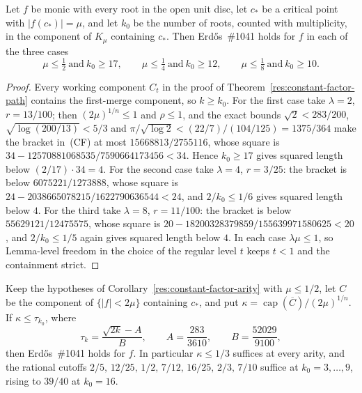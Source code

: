 \documentclass[11pt]{article}
\begin{document}
\begin{corollary}
\label{res:constant-factor-arity}
Let $f$ be monic with every root in the open unit disc, let $c_*$ be a
critical point with $|f(c_*)|=\mu$, and let $k_0$ be the number of roots,
counted with multiplicity, in the component of $K_\mu$ containing $c_*$.
Then Erd\H{o}s~\#1041 holds for $f$ in each of the three cases
\[
 \mu\le\tfrac12\ \text{and}\ k_0\ge17,\qquad
 \mu\le\tfrac14\ \text{and}\ k_0\ge12,\qquad
 \mu\le\tfrac18\ \text{and}\ k_0\ge10 .
\]
\end{corollary}

\begin{proof}
Every working component $C_t$ in the proof of
Theorem~\ref{res:constant-factor-path} contains the first-merge component, so
$k\ge k_0$.  For the first case take $\lambda=2$, $r=13/100$; then
$(2\mu)^{1/n}\le1$ and $\rho\le1$, and the exact bounds
$\sqrt2<283/200$, $\sqrt{\log(200/13)}<5/3$ and
$\pi/\sqrt{\log2}<(22/7)/(104/125)=1375/364$ make the bracket in~(CF) at most
$15668813/2755116$, whose square is $34-12570881068535/7590664173456<34$.
Hence $k_0\ge17$ gives squared length below $(2/17)\cdot34=4$.  For the second
case take $\lambda=4$, $r=3/25$: the bracket is below $6075221/1273888$, whose
square is $24-2038665078215/1622790636544<24$, and $2/k_0\le1/6$ gives squared
length below $4$.  For the third take $\lambda=8$, $r=11/100$: the bracket is
below $55629121/12475575$, whose square is
$20-18200328379859/155639971580625<20$, and $2/k_0\le1/5$ again gives squared
length below $4$.  In each case $\lambda\mu\le1$, so Lemma-level freedom in
the choice of the regular level $t$ keeps $t<1$ and the containment strict.
\end{proof}

\begin{corollary}
\label{res:constant-factor-capacity}
Keep the hypotheses of Corollary~\ref{res:constant-factor-arity} with
$\mu\le1/2$, let $C$ be the component of $\{|f|<2\mu\}$ containing $c_*$, and
put $\kappa=\operatorname{cap}(\overline C)/(2\mu)^{1/n}$.  If
$\kappa\le\tau_{k_0}$, where
\[
 \tau_k=\frac{\sqrt{2k}-A}{B},\qquad
 A=\frac{283}{3610},\qquad B=\frac{52029}{9100},
\]
then Erd\H{o}s~\#1041 holds for $f$.  In particular $\kappa\le1/3$ suffices at
every arity, and the rational cutoffs
$2/5,\,12/25,\,1/2,\,7/12,\,16/25,\,2/3,\,7/10$ suffice at
$k_0=3,\ldots,9$, rising to $39/40$ at $k_0=16$.
\end{corollary}
\end{document}
